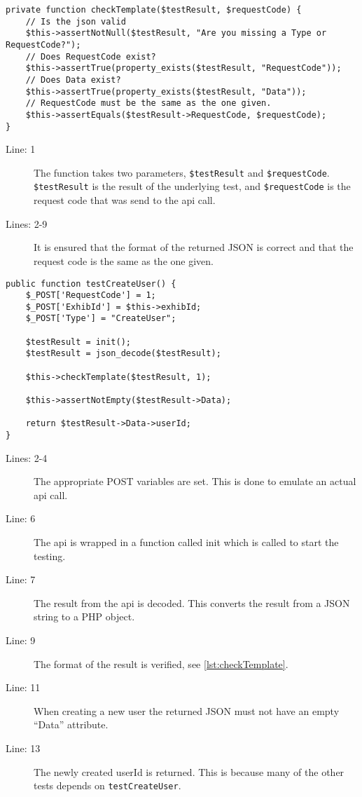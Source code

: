 \begin{lstlisting}[language=phpstyle, label=lst:checkTemplate, caption={checkTemplate unit test}]
private function checkTemplate($testResult, $requestCode) {
    // Is the json valid
    $this->assertNotNull($testResult, "Are you missing a Type or RequestCode?");
    // Does RequestCode exist?
    $this->assertTrue(property_exists($testResult, "RequestCode"));
    // Does Data exist?
    $this->assertTrue(property_exists($testResult, "Data"));    
    // RequestCode must be the same as the one given.
    $this->assertEquals($testResult->RequestCode, $requestCode);
}
\end{lstlisting}%
\begin{description}
\item[Line: 1] The function takes two parameters, \lstinline|$testResult| and \lstinline|$requestCode|. \lstinline|$testResult| is the result of the underlying test, and \lstinline|$requestCode| is the request code that was send to the api call.
\item[Lines: 2-9] It is ensured that the format of the returned JSON is correct and that the request code is the same as the one given. 
\end{description}

\begin{lstlisting}[language=phpstyle, label=lst:testCreateUser, caption={createUser unit test}]
public function testCreateUser() {
    $_POST['RequestCode'] = 1;
    $_POST['ExhibId'] = $this->exhibId;
    $_POST['Type'] = "CreateUser";

    $testResult = init();
    $testResult = json_decode($testResult);

    $this->checkTemplate($testResult, 1);

    $this->assertNotEmpty($testResult->Data);
    
    return $testResult->Data->userId;      
}
\end{lstlisting}%
\begin{description}
\item[Lines: 2-4] The appropriate POST variables are set. This is done to emulate an actual \ac{api} call.
\item[Line: 6] The \ac{api} is wrapped in a function called init which is called to start the testing.
\item[Line: 7] The result from the \ac{api} is decoded. This converts the result from a JSON string to a PHP object.
\item[Line: 9] The format of the result is verified, see \autoref{lst:checkTemplate}.
\item[Line: 11] When creating a new user the returned JSON must not have an empty ``Data'' attribute.
\item[Line: 13] The newly created userId is returned. This is because many of the other tests depends on \lstinline|testCreateUser|.
\end{description}

